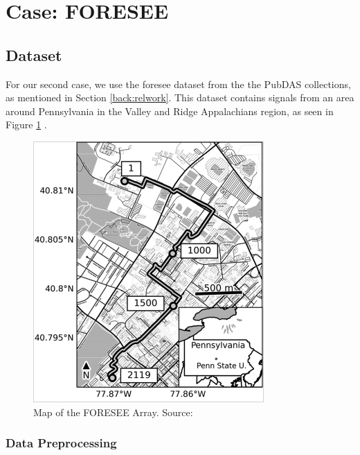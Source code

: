 \section{Case: FORESEE}

\subsection{Dataset}

For our second case, we use the \acrshort{foresee} dataset from the the PubDAS collections, as mentioned in Section \ref{back:relwork}. This dataset contains signals from an area around Pennsylvania in the Valley and Ridge Appalachians region, as seen in Figure \ref{fig:foresee} \cite{se-12-219-2021}. \\

\begin{figure}[!h]
    \centering
    \includegraphics[width=0.5\linewidth]{figures/foresee.png}
    \caption{Map of the FORESEE Array. Source: \cite{spica2023pubdas}}
    \label{fig:foresee}
\end{figure}

\subsubsection{Data Preprocessing}
\label{exp:fordata}

